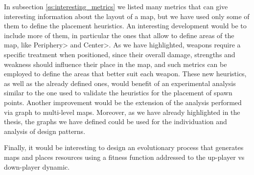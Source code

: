 \par

In subsection \ref{ss:interesting_metrics} we listed many metrics that can give interesting information about the layout of a map, but we have used only some of them to define the placement heuristics. An interesting development would be to include more of them, in particular the ones that allow to define areas of the map, like \<Periphery> and \<Center>. As we have highlighted, weapons require a specific treatment when positioned, since their overall damage, strengths and weakness should influence their place in the map, and such metrics can be employed to define the areas that better suit each weapon. These new heuristics, as well as the already defined ones, would benefit of an experimental analysis similar to the one used to validate the heuristics for the placement of spawn points. Another improvement would be the extension of the analysis performed via graph to multi-level maps. Moreover, as we have already highlighted in the thesis, the graphs we have defined could be used for the individuation and analysis of design patterns.

\par

Finally, it would be interesting to design an evolutionary process that generates maps and places resources using a fitness function addressed to the up-player vs down-player dynamic.